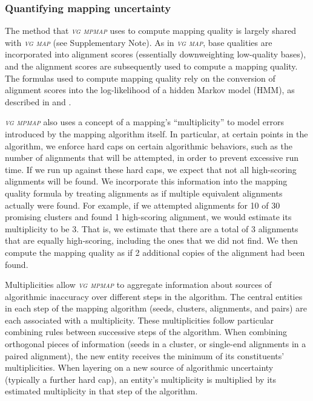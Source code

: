 \documentclass[11pt]{ucthesis}
\newcommand{\tool}[1]{\emph{\textsc{#1}}}
\begin{document}
\subsubsection{Quantifying mapping uncertainty}

The method that \tool{vg mpmap} uses to compute mapping quality is largely shared with \tool{vg map} (see \cite{garrison2018variation} Supplementary Note). As in \tool{vg map}, base qualities are incorporated into alignment scores (essentially downweighting low-quality bases), and the alignment scores are subsequently used to compute a mapping quality. The formulas used to compute mapping quality rely on the conversion of alignment scores into the log-likelihood of a hidden Markov model (HMM), as described in \cite{durbin1998biological} and \cite{karlin1990methods}. 

\tool{vg mpmap} also uses a concept of a mapping's ``multiplicity'' to model errors introduced by the mapping algorithm itself. In particular, at certain points in the algorithm, we enforce hard caps on certain algorithmic behaviors, such as the number of alignments that will be attempted, in order to prevent excessive run time. If we run up against these hard caps, we expect that not all high-scoring alignments will be found. We incorporate this information into the mapping quality formula by treating alignments as if multiple equivalent alignments actually were found. For example, if we attempted alignments for 10 of 30 promising clusters and found 1 high-scoring alignment, we would estimate its multiplicity to be 3. That is, we estimate that there are a total of 3 alignments that are equally high-scoring, including the ones that we did not find. We then compute the mapping quality as if 2 additional copies of the alignment had been found.

Multiplicities allow \tool{vg mpmap} to aggregate information about sources of algorithmic inaccuracy over different steps in the algorithm. The central entities in each step of the mapping algorithm (seeds, clusters, alignments, and pairs) are each associated with a multiplicity. These multiplicities follow particular combining rules between successive steps of the algorithm. When combining orthogonal pieces of information (seeds in a cluster, or single-end alignments in a paired alignment), the new entity receives the minimum of its constituents' multiplicities. When layering on a new source of algorithmic uncertainty (typically a further hard cap), an entity's multiplicity is multiplied by its estimated multiplicity in that step of the algorithm.
\end{document}
